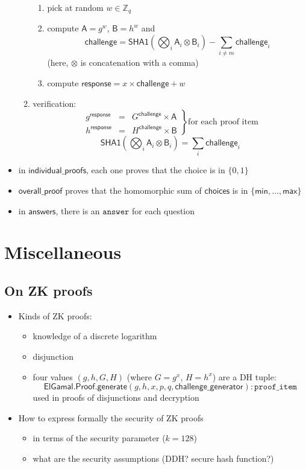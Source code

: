 \documentclass[a4paper]{article}
\newcommand{\Z}{\mathbb{Z}}
\begin{document}
\begin{itemize}
\begin{enumerate}
\begin{enumerate}
    \item pick at random $w\in\Z_q$
    \item compute $\textsf{A}=g^w$, $\textsf{B}=h^w$ and
      \[
      \textsf{challenge}=
      \textsf{SHA1}\left(\bigotimes_i\textsf{A}_i\otimes\textsf{B}_i\right)-
      \sum_{i\neq m} \textsf{challenge}_i
      \]
      (here, $\otimes$ is concatenation with a comma)
    \item compute $\textsf{response}=x\times\textsf{challenge}+w$
    \end{enumerate}
  \item verification:
    \[
      \left.\begin{array}{rcl}
          g^{\textsf{response}}&=&G^{\textsf{challenge}}\times\textsf{A}\\
          h^{\textsf{response}}&=&H^{\textsf{challenge}}\times\textsf{B}
        \end{array}
      \right\}\textrm{for each proof item}
    \]
    \[
    \textsf{SHA1}\left(\bigotimes_i\textsf{A}_i\otimes\textsf{B}_i\right)=
    \sum_i \textsf{challenge}_i
    \]
  \end{enumerate}
\item in $\textsf{individual\_proofs}$, each one proves that the
  choice is in $\{0,1\}$
\item $\textsf{overall\_proof}$ proves that the homomorphic sum of
  $\textsf{choices}$ is in $\{\textsf{min},\dots,\textsf{max}\}$
\item in $\textsf{answers}$, there is an $\texttt{answer}$ for each
  question
\end{itemize}

\section{Miscellaneous}

\subsection{On ZK proofs}
\begin{itemize}
\item Kinds of ZK proofs:
  \begin{itemize}
  \item knowledge of a discrete logarithm
  \item disjunction
  \item four values $(g,h,G,H)$ (where $G=g^x$, $H=h^x$) are a DH
    tuple:
    \[
    \textsf{ElGamal.Proof.generate}(g,h,x,p,q,\textsf{challenge\_generator}):
    \texttt{proof\_item}\]
    used in proofs of disjunctions and decryption
  \end{itemize}
\item How to express formally the security of ZK proofs
  \begin{itemize}
  \item in terms of the security parameter ($k=128$)
  \item what are the security assumptions (DDH? secure hash function?)
  \end{itemize}
\end{itemize}
\end{document}

